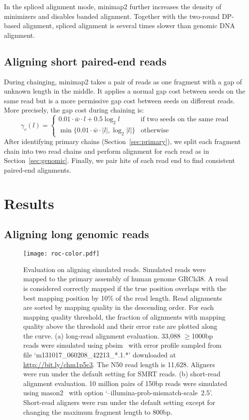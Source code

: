\documentclass{bioinfo}
\begin{document}
\begin{methods}
In the spliced alignment mode, minimap2 further increases the density of
minimizers and disables banded alignment. Together with the two-round DP-based
alignment, spliced alignment is several times slower than genomic DNA
alignment.

\subsection{Aligning short paired-end reads}

During chainging, minimap2 takes a pair of reads as one fragment with a gap of
unknown length in the middle. It applies a normal gap cost between seeds on the
same read but is a more permissive gap cost between seeds on different reads.
More precisely, the gap cost during chaining is:
\[
\gamma_c(l)=\left\{\begin{array}{ll}
0.01\cdot\bar{w}\cdot l+0.5\log_2 l & \mbox{if two seeds on the same read} \\
\min\{0.01\cdot\bar{w}\cdot|l|,\log_2|l|\} & \mbox{otherwise}
\end{array}\right.
\]
After identifying primary chains (Section~\ref{sec:primary}), we split each
fragment chain into two read chains and perform alignment for each read as in
Section~\ref{sec:genomic}.  Finally, we pair hits of each read end to find
consistent paired-end alignments.

\end{methods}

\section{Results}

\subsection{Aligning long genomic reads}

\begin{figure}[!tb]
\centering
\texttt{[image: roc-color.pdf]}
\caption{Evaluation on aligning simulated reads. Simulated reads were mapped 
to the primary assembly of human genome GRCh38. A read is considered correctly
mapped if the true position overlaps with the best mapping position by 10\% of
the read length. Read alignments are sorted by mapping quality in the
descending order. For each mapping quality threshold, the fraction of
alignments with mapping quality above the threshold and their error rate are
plotted along the curve. (a) long-read alignment evaluation. 33,088 $\ge$1000bp
reads were simulated using pbsim~\citep{Ono:2013aa} with error profile sampled
from file `m131017\_060208\_42213\_*.1.*' downloaded at
\href{http://bit.ly/chm1p5c3}{http://bit.ly/chm1p5c3}. The N50 read length is
11,628. Aligners were run under the default setting for SMRT reads.
(b) short-read alignment evaluation. 10 million pairs of 150bp reads were
simulated using mason2~\citep{Holtgrewe:2010aa} with option
`\mbox{--illumina-prob-mismatch-scale 2.5}'. Short-read aligners were run under the
default setting except for changing the maximum fragment length to
800bp.}\label{fig:eval}
\end{figure}
\end{document}
